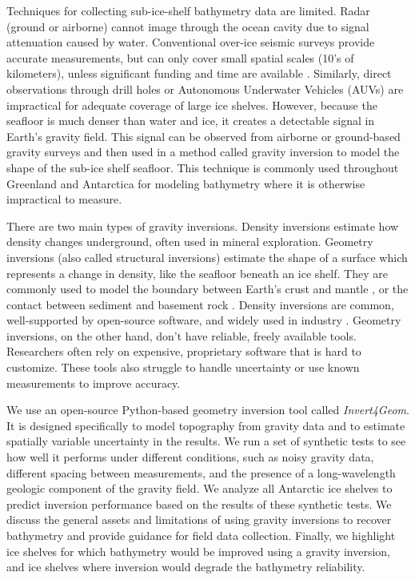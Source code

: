 \documentclass[tc, manuscript]{copernicus}
\begin{document}
Techniques for collecting sub-ice-shelf bathymetry data are limited. Radar (ground or airborne) cannot image through the ocean cavity due to signal attenuation caused by water. Conventional over-ice seismic surveys provide accurate measurements, but can only cover small spatial scales (10's of kilometers), unless significant funding and time are available \citep[e.g., the RIGGS survey;][]{bentleyross1984}. Similarly, direct observations through drill holes or Autonomous Underwater Vehicles (AUVs) are impractical for adequate coverage of large ice shelves. However, because the seafloor is much denser than water and ice, it creates a detectable signal in Earth's gravity field. This signal can be observed from airborne or ground-based gravity surveys and then used in a method called gravity inversion to model the shape of the sub-ice shelf seafloor. This technique is commonly used throughout Greenland \citep[e.g.][]{millanvulnerability2018, anbathymetry2019a} and Antarctica \citep[e.g.][]{vankovahigh2023,lockenovel2025,constantinocook2023, charrassinbathymetry2025} for modeling bathymetry where it is otherwise impractical to measure.

There are two main types of gravity inversions. Density inversions estimate how density changes underground, often used in mineral exploration. Geometry inversions (also called structural inversions) estimate the shape of a surface which represents a change in density, like the seafloor beneath an ice shelf. They are commonly used to model the boundary between Earth's crust and mantle \citep[e.g][]{uiedafast2017, borghimoho2022}, or the contact between sediment and basement rock \citep[e.g.][]{santosefficient2015, barbosagravity2007}. Density inversions are common, well-supported by open-source software, and widely used in industry \citep{oldenburggeophysical2007, cockettsimpeg2015, ruckerpygimli2017}. Geometry inversions, on the other hand, don't have reliable, freely available tools. Researchers often rely on expensive, proprietary software that is hard to customize. These tools also struggle to handle uncertainty or use known measurements to improve accuracy.

We use an open-source Python-based geometry inversion tool called \textit{Invert4Geom}. It is designed specifically to model topography from gravity data and to estimate spatially variable uncertainty in the results.  We run a set of synthetic tests to see how well it performs under different conditions, such as noisy gravity data, different spacing between measurements, and the presence of a long-wavelength geologic component of the gravity field. We analyze all Antarctic ice shelves to predict inversion performance based on the results of these synthetic tests. We discuss the general assets and limitations of using gravity inversions to recover bathymetry and provide guidance for field data collection. Finally, we highlight ice shelves for which bathymetry would be improved using a gravity inversion, and ice shelves where inversion would degrade the bathymetry reliability.
\end{document}
